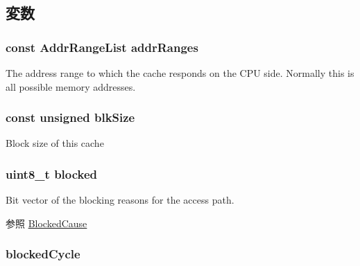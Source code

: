 \subsection{変数}
\hypertarget{classBaseCache_aad23e5e7311cbfb1189b674238254c39}{
\subsubsection[{addrRanges}]{\setlength{\rightskip}{0pt plus 5cm}const {\bf AddrRangeList} {\bf addrRanges}}}
\label{classBaseCache_aad23e5e7311cbfb1189b674238254c39}
The address range to which the cache responds on the CPU side. Normally this is all possible memory addresses. \hypertarget{classBaseCache_a87b03496724866a3daf3e8ebeb831290}{
\subsubsection[{blkSize}]{\setlength{\rightskip}{0pt plus 5cm}const unsigned {\bf blkSize}}}
\label{classBaseCache_a87b03496724866a3daf3e8ebeb831290}
Block size of this cache \hypertarget{classBaseCache_a1618f82ecde158c73f229ae4cc0f6f8b}{
\subsubsection[{blocked}]{\setlength{\rightskip}{0pt plus 5cm}uint8\_\-t {\bf blocked}}}
\label{classBaseCache_a1618f82ecde158c73f229ae4cc0f6f8b}
Bit vector of the blocking reasons for the access path. \begin{DoxySeeAlso}{参照}
\hyperlink{classBaseCache_a98297f294858ead7eafd19af93e64c6d}{BlockedCause} 
\end{DoxySeeAlso}
\hypertarget{classBaseCache_ae1148c48e3f5a892c0576b7e10eec8d0}{
\subsubsection[{blockedCycle}]{ {\bf blockedCycle}}}
